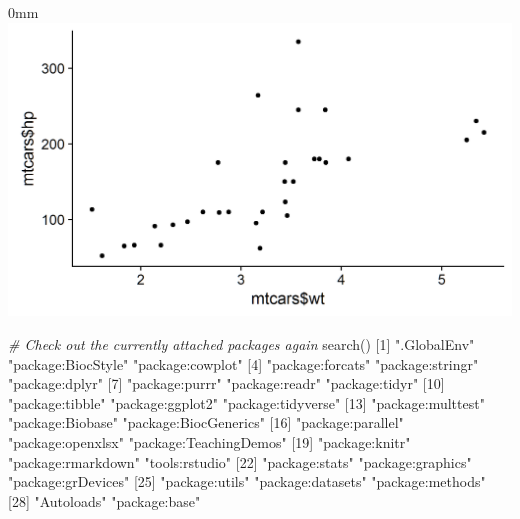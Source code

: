 \documentclass[]{article}
\newcommand{\hlnum}[1]{\textcolor[rgb]{0.816,0.125,0.439}{#1}}%
\newcommand{\hlstr}[1]{\textcolor[rgb]{0.251,0.627,0.251}{#1}}%
\newcommand{\hlcom}[1]{\textcolor[rgb]{0.502,0.502,0.502}{\textit{#1}}}%
\newcommand{\hlstd}[1]{\textcolor[rgb]{0.251,0.251,0.251}{#1}}%
\newcommand{\hlkwd}[1]{\textcolor[rgb]{0.878,0.439,0.125}{#1}}%
\newenvironment{Shaded}{\begin{myshaded}}{\end{myshaded}}
\newcommand{\KeywordTok}[1]{\hlkwd{#1}}
\newcommand{\DecValTok}[1]{\hlnum{#1}}
\newcommand{\StringTok}[1]{\hlstr{#1}}
\newcommand{\CommentTok}[1]{\hlcom{#1}}
\newcommand{\NormalTok}[1]{\hlstd{#1}}
\begin{document}
\begin{adjustwidth}{\fltoffset}{0mm}
\includegraphics{RIntermediate_files/figure-latex/unnamed-chunk-99-1} \end{adjustwidth}

\begin{Shaded}
\begin{Highlighting}[]

\CommentTok{# Check out the currently attached packages again}
\KeywordTok{search}\NormalTok{()}
\NormalTok{    [}\DecValTok{1}\NormalTok{] }\StringTok{".GlobalEnv"}            \StringTok{"package:BiocStyle"}     \StringTok{"package:cowplot"}      
\NormalTok{    [}\DecValTok{4}\NormalTok{] }\StringTok{"package:forcats"}       \StringTok{"package:stringr"}       \StringTok{"package:dplyr"}        
\NormalTok{    [}\DecValTok{7}\NormalTok{] }\StringTok{"package:purrr"}         \StringTok{"package:readr"}         \StringTok{"package:tidyr"}        
\NormalTok{   [}\DecValTok{10}\NormalTok{] }\StringTok{"package:tibble"}        \StringTok{"package:ggplot2"}       \StringTok{"package:tidyverse"}    
\NormalTok{   [}\DecValTok{13}\NormalTok{] }\StringTok{"package:multtest"}      \StringTok{"package:Biobase"}       \StringTok{"package:BiocGenerics"} 
\NormalTok{   [}\DecValTok{16}\NormalTok{] }\StringTok{"package:parallel"}      \StringTok{"package:openxlsx"}      \StringTok{"package:TeachingDemos"}
\NormalTok{   [}\DecValTok{19}\NormalTok{] }\StringTok{"package:knitr"}         \StringTok{"package:rmarkdown"}     \StringTok{"tools:rstudio"}        
\NormalTok{   [}\DecValTok{22}\NormalTok{] }\StringTok{"package:stats"}         \StringTok{"package:graphics"}      \StringTok{"package:grDevices"}    
\NormalTok{   [}\DecValTok{25}\NormalTok{] }\StringTok{"package:utils"}         \StringTok{"package:datasets"}      \StringTok{"package:methods"}      
\NormalTok{   [}\DecValTok{28}\NormalTok{] }\StringTok{"Autoloads"}             \StringTok{"package:base"}
\end{Highlighting}
\end{Shaded}
\end{document}
